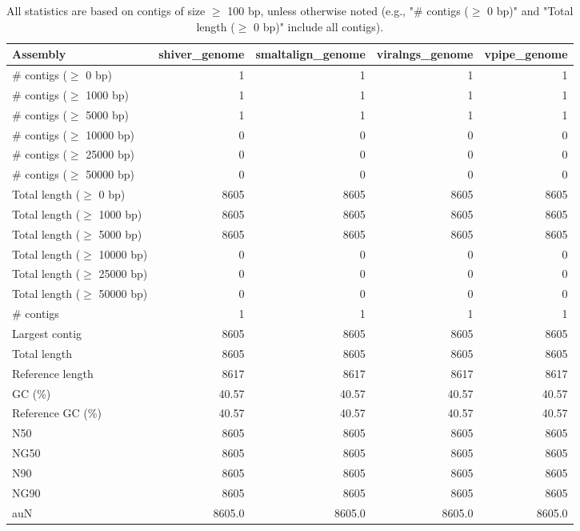\documentclass[12pt,a4paper]{article}
\begin{document}
\begin{table}[ht]
\begin{center}
\caption{All statistics are based on contigs of size $\geq$ 100 bp, unless otherwise noted (e.g., "\# contigs ($\geq$ 0 bp)" and "Total length ($\geq$ 0 bp)" include all contigs).}
\begin{tabular}{|l*{4}{|r}|}
\hline
Assembly & shiver\_genome & smaltalign\_genome & viralngs\_genome & vpipe\_genome \\ \hline
\# contigs ($\geq$ 0 bp) & 1 & 1 & 1 & 1 \\ \hline
\# contigs ($\geq$ 1000 bp) & 1 & 1 & 1 & 1 \\ \hline
\# contigs ($\geq$ 5000 bp) & 1 & 1 & 1 & 1 \\ \hline
\# contigs ($\geq$ 10000 bp) & 0 & 0 & 0 & 0 \\ \hline
\# contigs ($\geq$ 25000 bp) & 0 & 0 & 0 & 0 \\ \hline
\# contigs ($\geq$ 50000 bp) & 0 & 0 & 0 & 0 \\ \hline
Total length ($\geq$ 0 bp) & 8605 & 8605 & 8605 & 8605 \\ \hline
Total length ($\geq$ 1000 bp) & 8605 & 8605 & 8605 & 8605 \\ \hline
Total length ($\geq$ 5000 bp) & 8605 & 8605 & 8605 & 8605 \\ \hline
Total length ($\geq$ 10000 bp) & 0 & 0 & 0 & 0 \\ \hline
Total length ($\geq$ 25000 bp) & 0 & 0 & 0 & 0 \\ \hline
Total length ($\geq$ 50000 bp) & 0 & 0 & 0 & 0 \\ \hline
\# contigs & 1 & 1 & 1 & 1 \\ \hline
Largest contig & 8605 & 8605 & 8605 & 8605 \\ \hline
Total length & 8605 & 8605 & 8605 & 8605 \\ \hline
Reference length & 8617 & 8617 & 8617 & 8617 \\ \hline
GC (\%) & 40.57 & 40.57 & 40.57 & 40.57 \\ \hline
Reference GC (\%) & 40.57 & 40.57 & 40.57 & 40.57 \\ \hline
N50 & 8605 & 8605 & 8605 & 8605 \\ \hline
NG50 & 8605 & 8605 & 8605 & 8605 \\ \hline
N90 & 8605 & 8605 & 8605 & 8605 \\ \hline
NG90 & 8605 & 8605 & 8605 & 8605 \\ \hline
auN & 8605.0 & 8605.0 & 8605.0 & 8605.0 \\ \hline

\end{tabular}
\end{center}
\end{table}
\end{document}
